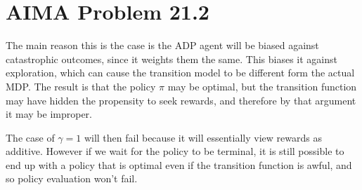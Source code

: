 \documentclass[11pt]{article}
\begin{document}
\section{AIMA Problem 21.2}

The main reason this is the case is the ADP agent will be biased against catastrophic outcomes, since it weights them the same. This biases it against exploration, which can cause the transition model to be different form the actual MDP. The result is that the policy $\pi$ may be optimal, but the transition function may have hidden the propensity to seek rewards, and therefore by that argument it may be improper.

The case of $\gamma = 1$ will then fail because it will essentially view rewards as additive. However if we wait for the policy to be terminal, it is still possible to end up with a policy that is optimal even if the transition function is awful, and so policy evaluation won't fail.
\end{document}
